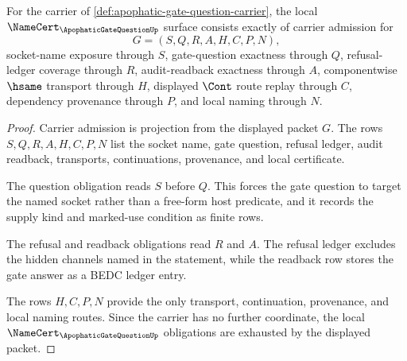 \begin{theorem}
\label{thm:apophatic-gate-question-namecert-obligations}
For the carrier of \autoref{def:apophatic-gate-question-carrier}, the local $\NameCert_{\ApophaticGateQuestionUp}$ surface consists exactly of carrier admission for
$$
G=(S,Q,R,A,H,C,P,N),
$$
socket-name exposure through $S$, gate-question exactness through $Q$, refusal-ledger coverage through $R$, audit-readback exactness through $A$, componentwise $\hsame$ transport through $H$, displayed $\Cont$ route replay through $C$, dependency provenance through $P$, and local naming through $N$.
\end{theorem}
\begin{proof}
Carrier admission is projection from the displayed packet $G$. The rows $S,Q,R,A,H,C,P,N$ list the socket name, gate question, refusal ledger, audit readback, transports, continuations, provenance, and local certificate.

The question obligation reads $S$ before $Q$. This forces the gate question to target the named socket rather than a free-form host predicate, and it records the supply kind and marked-use condition as finite rows.

The refusal and readback obligations read $R$ and $A$. The refusal ledger excludes the hidden channels named in the statement, while the readback row stores the gate answer as a BEDC ledger entry.

The rows $H,C,P,N$ provide the only transport, continuation, provenance, and local naming routes. Since the carrier has no further coordinate, the local $\NameCert_{\ApophaticGateQuestionUp}$ obligations are exhausted by the displayed packet.
\end{proof}

